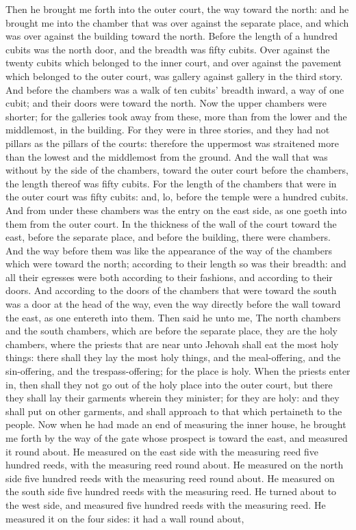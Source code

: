 Then he brought me forth into the outer court, the way toward the north: and he brought me into the chamber that was over against the separate place, and which was over against the building toward the north. Before the length of a hundred cubits was the north door, and the breadth was fifty cubits. Over against the twenty cubits which belonged to the inner court, and over against the pavement which belonged to the outer court, was gallery against gallery in the third story. And before the chambers was a walk of ten cubits’ breadth inward, a way of one cubit; and their doors were toward the north. Now the upper chambers were shorter; for the galleries took away from these, more than from the lower and the middlemost, in the building. For they were in three stories, and they had not pillars as the pillars of the courts: therefore the uppermost was straitened more than the lowest and the middlemost from the ground. And the wall that was without by the side of the chambers, toward the outer court before the chambers, the length thereof was fifty cubits. For the length of the chambers that were in the outer court was fifty cubits: and, lo, before the temple were a hundred cubits. And from under these chambers was the entry on the east side, as one goeth into them from the outer court.  In the thickness of the wall of the court toward the east, before the separate place, and before the building, there were chambers. And the way before them was like the appearance of the way of the chambers which were toward the north; according to their length so was their breadth: and all their egresses were both according to their fashions, and according to their doors. And according to the doors of the chambers that were toward the south was a door at the head of the way, even the way directly before the wall toward the east, as one entereth into them.  Then said he unto me, The north chambers and the south chambers, which are before the separate place, they are the holy chambers, where the priests that are near unto Jehovah shall eat the most holy things: there shall they lay the most holy things, and the meal-offering, and the sin-offering, and the trespass-offering; for the place is holy. When the priests enter in, then shall they not go out of the holy place into the outer court, but there they shall lay their garments wherein they minister; for they are holy: and they shall put on other garments, and shall approach to that which pertaineth to the people.  Now when he had made an end of measuring the inner house, he brought me forth by the way of the gate whose prospect is toward the east, and measured it round about. He measured on the east side with the measuring reed five hundred reeds, with the measuring reed round about. He measured on the north side five hundred reeds with the measuring reed round about. He measured on the south side five hundred reeds with the measuring reed. He turned about to the west side, and measured five hundred reeds with the measuring reed. He measured it on the four sides: it had a wall round about, 